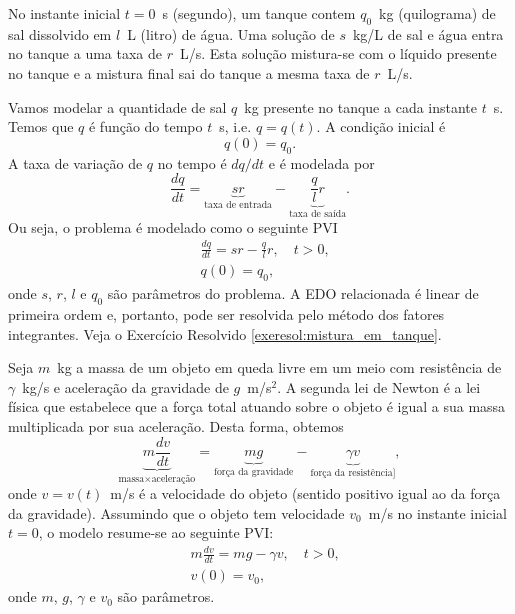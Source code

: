 \begin{ex}
  No instante inicial $t=0$~s (segundo), um tanque contem $q_0$~kg (quilograma) de sal dissolvido em $l$~L (litro) de água. Uma solução de $s$~kg/L de sal e água entra no tanque a uma taxa de $r$~L/s. Esta solução mistura-se com o líquido presente no tanque e a mistura final sai do tanque a mesma taxa de $r$~L/s.

  Vamos modelar a quantidade de sal $q$~kg presente no tanque a cada instante $t$~s. Temos que $q$ é função do tempo $t$~s, i.e. $q = q(t)$. A condição inicial é
  \begin{equation}
    q(0) = q_0.
  \end{equation}
  A taxa de variação de $q$ no tempo é $dq/dt$ e é modelada por
  \begin{equation}
    \frac{dq}{dt} = \underbrace{sr}_{\text{taxa de entrada}} - \underbrace{\frac{q}{l}r}_{\text{taxa de saída}}.
  \end{equation}
  Ou seja, o problema é modelado como o seguinte PVI
  \begin{align}
    &\frac{dq}{dt} = sr - \frac{q}{l}r,\quad t>0,\\
    &q(0) = q_0,
  \end{align}
  onde $s$, $r$, $l$ e $q_0$ são parâmetros do problema. A EDO relacionada é linear de primeira ordem e, portanto, pode ser resolvida pelo método dos fatores integrantes. Veja o Exercício Resolvido \ref{exeresol:mistura_em_tanque}.
\end{ex}

\begin{ex}
  Seja $m$~kg a massa de um objeto em queda livre em um meio com resistência de $\gamma$~kg/s e aceleração da gravidade de $g$~m/s$^2$. A segunda lei de Newton é a lei física que estabelece que a força total atuando sobre o objeto é igual a sua massa multiplicada por sua aceleração. Desta forma, obtemos
  \begin{equation}
    \underbrace{m\frac{dv}{dt}}_{\text{massa}\times\text{aceleração}} = \underbrace{mg}_{\text{força da gravidade}} - \underbrace{\gamma v}_{\text{força da resistência}]},
  \end{equation}
  onde $v = v(t)$~m/s é a velocidade do objeto (sentido positivo igual ao da força da gravidade). Assumindo que o objeto tem velocidade $v_0$~m/s no instante inicial $t=0$, o modelo resume-se ao seguinte PVI:
  \begin{align}
    &m\frac{dv}{dt} = mg - \gamma v,\quad t>0, \\
    &v(0) = v_0,
  \end{align}
  onde $m$, $g$, $\gamma$ e $v_0$ são parâmetros.
\end{ex}

